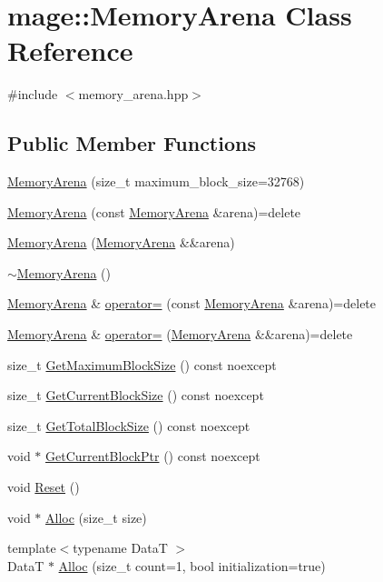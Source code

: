 \hypertarget{classmage_1_1_memory_arena}{}\section{mage\+:\+:Memory\+Arena Class Reference}
\label{classmage_1_1_memory_arena}


{\ttfamily \#include $<$memory\+\_\+arena.\+hpp$>$}

\subsection*{Public Member Functions}
\begin{DoxyCompactItemize}
\item 
\hyperlink{classmage_1_1_memory_arena_a5182142d8ae2c7bc3eb1bae4f1a10d29}{Memory\+Arena} (size\+\_\+t maximum\+\_\+block\+\_\+size=32768)
\item 
\hyperlink{classmage_1_1_memory_arena_a1eca6fdacbd1226f4b21f443d118168b}{Memory\+Arena} (const \hyperlink{classmage_1_1_memory_arena}{Memory\+Arena} \&arena)=delete
\item 
\hyperlink{classmage_1_1_memory_arena_a98829c5a87ba028c376f100cca09e876}{Memory\+Arena} (\hyperlink{classmage_1_1_memory_arena}{Memory\+Arena} \&\&arena)
\item 
\hyperlink{classmage_1_1_memory_arena_acfee6fc205e2eaf6aeef4acf19948e6e}{$\sim$\+Memory\+Arena} ()
\item 
\hyperlink{classmage_1_1_memory_arena}{Memory\+Arena} \& \hyperlink{classmage_1_1_memory_arena_a7e7799f859c55435714933972ecb8b95}{operator=} (const \hyperlink{classmage_1_1_memory_arena}{Memory\+Arena} \&arena)=delete
\item 
\hyperlink{classmage_1_1_memory_arena}{Memory\+Arena} \& \hyperlink{classmage_1_1_memory_arena_aa4b80a917a838a1ca3788f906723d273}{operator=} (\hyperlink{classmage_1_1_memory_arena}{Memory\+Arena} \&\&arena)=delete
\item 
size\+\_\+t \hyperlink{classmage_1_1_memory_arena_a6786cf52a03777580b439cafdd8ff8f9}{Get\+Maximum\+Block\+Size} () const noexcept
\item 
size\+\_\+t \hyperlink{classmage_1_1_memory_arena_a0b41d6901c3519f046cd551931f72c1b}{Get\+Current\+Block\+Size} () const noexcept
\item 
size\+\_\+t \hyperlink{classmage_1_1_memory_arena_ac8e8ac4ba60cd2bb1d8dc8a5d4a9f4ad}{Get\+Total\+Block\+Size} () const noexcept
\item 
void $\ast$ \hyperlink{classmage_1_1_memory_arena_a7bdbc9da32c1f8d49ce5d2f153870284}{Get\+Current\+Block\+Ptr} () const noexcept
\item 
void \hyperlink{classmage_1_1_memory_arena_a117b74c7bd5dfb28dfdaae6cab253491}{Reset} ()
\item 
void $\ast$ \hyperlink{classmage_1_1_memory_arena_a2e63b11c535dbfefd69d071466be9ce1}{Alloc} (size\+\_\+t size)
\item 
{\footnotesize template$<$typename DataT $>$ }\\DataT $\ast$ \hyperlink{classmage_1_1_memory_arena_a6797843db400848170d0b448a8a7e3b5}{Alloc} (size\+\_\+t count=1, bool initialization=true)
\end{DoxyCompactItemize}
